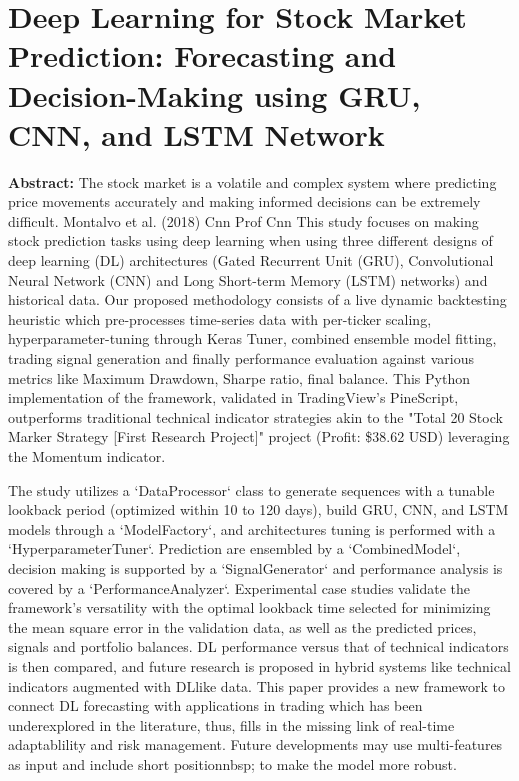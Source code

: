 \chapter{Deep Learning for Stock Market Prediction: Forecasting and Decision-Making using GRU, CNN, and LSTM Network}


\textbf{Abstract: }
The stock market is a volatile and complex system where predicting price movements accurately and making informed decisions can be extremely difficult. Montalvo et al. (2018) Cnn Prof Cnn This study focuses on making stock prediction tasks using deep learning when using three different designs of deep learning (DL) architectures (Gated Recurrent Unit (GRU), Convolutional Neural Network (CNN) and Long Short-term Memory (LSTM) networks) and historical data. Our proposed methodology consists of a live dynamic backtesting heuristic which pre-processes time-series data with per-ticker scaling, hyperparameter-tuning through Keras Tuner, combined ensemble model fitting, trading signal generation and finally performance evaluation against various metrics like Maximum Drawdown, Sharpe ratio, final balance. This Python implementation of the framework, validated in TradingView's PineScript, outperforms traditional technical indicator strategies akin to the "Total 20 Stock Marker Strategy [First Research Project]" project (Profit: \$38.62 USD) leveraging the Momentum indicator.

The study utilizes a `DataProcessor` class to generate sequences with a tunable lookback period (optimized within 10 to 120 days), build GRU, CNN, and LSTM models through a `ModelFactory`, and architectures tuning is performed with a `HyperparameterTuner`. Prediction are ensembled by a `CombinedModel`, decision making is supported by a `SignalGenerator` and performance analysis is covered by a `PerformanceAnalyzer`. Experimental case studies validate the framework's versatility with the optimal lookback time selected for minimizing the mean square error in the validation data, as well as the predicted prices, signals and portfolio balances. DL performance versus that of technical indicators is then compared, and future research is proposed in hybrid systems like technical indicators augmented with DLlike data. This paper provides a new framework to connect DL forecasting with applications in trading which has been underexplored in the literature, thus, fills in the missing link of real-time adaptablility and risk management. Future developments may use multi-features as input and include short positionnbsp; to make the model more robust.


